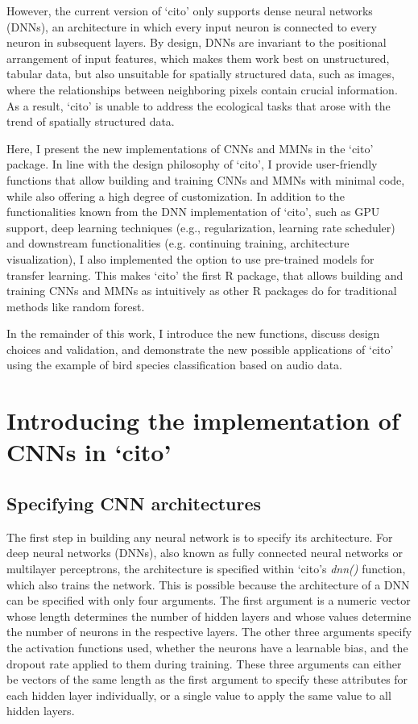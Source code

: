\documentclass[12pt,twoside]{scrreport}
\newcommand{\pkg}[1]{`#1'}
\newcommand{\fn}[2][]{\textit{#2(}#1\textit{)}}
\begin{document}
However, the current version of \pkg{cito} only supports dense neural networks (DNNs), an architecture in which every input neuron is connected to every neuron in subsequent layers. By design, DNNs are invariant to the positional arrangement of input features, which makes them work best on unstructured, tabular data, but also unsuitable for spatially structured data, such as images, where the relationships between neighboring pixels contain crucial information. As a result, \pkg{cito} is unable to address the ecological tasks that arose with the trend of spatially structured data.

Here, I present the new implementations of CNNs and MMNs in the \pkg{cito} package. In line with the design philosophy of \pkg{cito}, I provide user-friendly functions that allow building and training CNNs and MMNs with minimal code, while also offering a high degree of customization. In addition to the functionalities known from the DNN implementation of \pkg{cito}, such as GPU support, deep learning techniques (e.g., regularization, learning rate scheduler) and downstream functionalities (e.g. continuing training, architecture visualization), I also implemented the option to use pre-trained models for transfer learning. This makes \pkg{cito} the first R package, that allows building and training CNNs and MMNs as intuitively as other R packages do for traditional methods like random forest.

In the remainder of this work, I introduce the new functions, discuss design choices and validation, and demonstrate the new possible applications of \pkg{cito} using the example of bird species classification based on audio data.

\chapter*{Introducing the implementation of CNNs in \pkg{cito}}
\addcontentsline{toc}{chapter}{Introducing the implementation of CNNs in \pkg{cito}}

\section*{Specifying CNN architectures}
The first step in building any neural network is to specify its architecture. For deep neural networks (DNNs), also known as fully connected neural networks or multilayer perceptrons, the architecture is specified within \pkg{cito}s \fn{dnn} function, which also trains the network. This is possible because the architecture of a DNN can be specified with only four arguments. The first argument is a numeric vector whose length determines the number of hidden layers and whose values determine the number of neurons in the respective layers. The other three arguments specify the activation functions used, whether the neurons have a learnable bias, and the dropout rate applied to them during training. These three arguments can either be vectors of the same length as the first argument to specify these attributes for each hidden layer individually, or a single value to apply the same value to all hidden layers.
\end{document}
